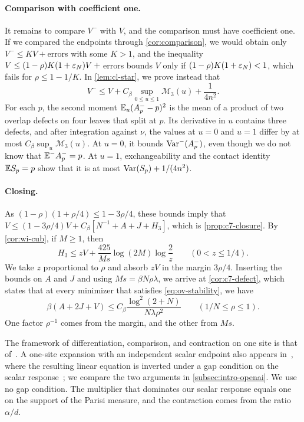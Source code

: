 \paragraph{Comparison with coefficient one.}
It remains to compare $V^-$ with $V$, and the comparison must have
coefficient one. If we compared the endpoints through
\cref{cor:comparison}, we would obtain only $V^-\le KV+{}$errors with
some $K>1$, and the inequality $V\le(1-\rho)K(1+\varepsilon_N)V+{}$errors bounds $V$
only if $(1-\rho)K(1+\varepsilon_N)<1$, which fails for $\rho\le1-1/K$. In
\cref{lem:cl-star}, we prove instead that
\[
 V^-\le V+C_\beta\sup_{0\le u\le1}\mathcal M_3(u)+\frac1{4n^2}.
\]
For each $p$, the second moment $\mathbb E_u(A^-_p-p)^2$ is the mean of a
product of two overlap defects on four leaves that split at $p$. Its
derivative in $u$ contains three defects, and after integration against
$\nu$, the values at $u=0$ and $u=1$ differ by at most
$C_\beta\sup_u\mathcal M_3(u)$. At $u=0$, it bounds $\operatorname{Var}^-(A^-_p)$, even
though we do not know that $\mathbb E^-A^-_p=p$. At $u=1$, exchangeability and
the contact identity $\mathbb E S_p=p$ show that it is at most
$\operatorname{Var}(S_p)+1/(4n^2)$.

\paragraph{Closing.}
As $(1-\rho)(1+\rho/4)\le1-3\rho/4$, these bounds imply that
$V\le(1-3\rho/4)V+C_\beta[N^{-1}+A+J+H_3]$, which is
\cref{prop:c7-closure}. By \cref{cor:wi-cub}, if $M\ge1$, then
\[
 H_3\le zV+\frac{425}{Ms}\log(2M)\log\frac2z\qquad(0<z\le1/4).
\]
We take $z$ proportional to $\rho$ and absorb $zV$ in the margin
$3\rho/4$. Inserting the bounds on $A$ and $J$ and using
$Ms=\beta N\rho\lambda$, we arrive at \cref{cor:c7-defect}, which states
that at every minimizer that satisfies \eqref{eq:ov-stability}, we have
\[
 \beta(A+2J+V)\le C_\beta\frac{\log^2(2+N)}{N\lambda\rho^2}
 \qquad(1/N\le\rho\le1).
\]
One factor $\rho^{-1}$ comes from the margin, and the other from $Ms$.

The framework of differentiation, comparison, and contraction on one
site is that of~\cite[Section~1.6]{TalagrandVolI2011}. A one-site
expansion with an independent scalar endpoint also appears
in~\cite[Lemma~2.2]{OpenAILimitingLaw}, where the resulting linear
equation is inverted under a gap condition on the scalar
response~\cite[Proposition~5.1]{OpenAILimitingLaw}; we compare the two
arguments in \cref{subsec:intro-openai}. We use no gap condition. The
multiplier that dominates our scalar response equals one on the support
of the Parisi measure, and the contraction comes from the ratio
$\alpha/d$.

